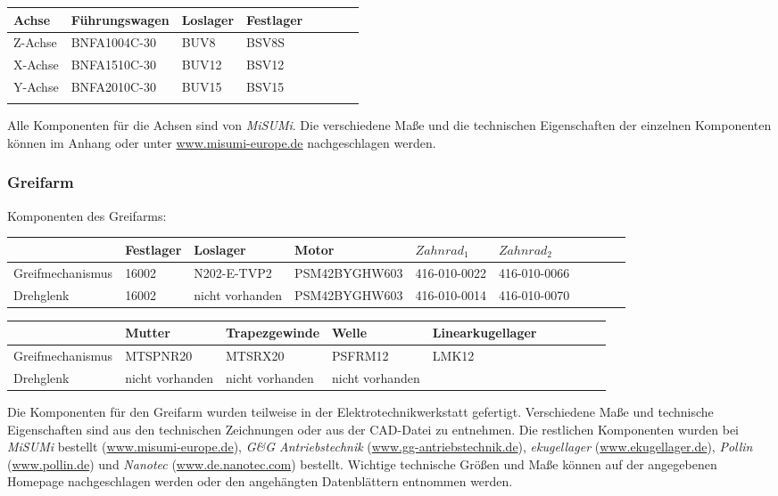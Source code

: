 \begin{tabular}{l l l l l l l l}
\rowcolor{hellgrün}
Achse&Führungswagen&Loslager&Festlager\\
\hline
Z-Achse&BNFA1004C-30&BUV8&BSV8S\\
\hline
X-Achse&BNFA1510C-30&BUV12&BSV12\\
\hline
Y-Achse&BNFA2010C-30&BUV15&BSV15\\
\newline
\newline
\end{tabular}

Alle Komponenten für die Achsen sind von \textsl{MiSUMi}. Die verschiedene Maße und die technischen Eigenschaften der einzelnen Komponenten  können im Anhang oder unter \url{www.misumi-europe.de} nachgeschlagen werden.
 


\subsubsection{Greifarm}




Komponenten des Greifarms:\\
\newline
\begin{tabular}{l| l l l l l l l l l}
\rowcolor{hellgrün}
 &Festlager&Loslager&Motor&$Zahnrad_1$&$Zahnrad_2$\\	%
\hline
Greifmechanismus&16002&N202-E-TVP2&PSM42BYGHW603&416-010-0022&416-010-0066\\
\hline
Drehglenk&16002&nicht vorhanden&PSM42BYGHW603&416-010-0014&416-010-0070\\
\end{tabular}
\newline
\newline

\begin{tabular}{l| l l l l l l l l l}
\rowcolor{hellgrün}
 &Mutter&Trapezgewinde&Welle&Linearkugellager\\	%
\hline
Greifmechanismus&MTSPNR20&MTSRX20&PSFRM12&LMK12\\
\hline
Drehglenk&nicht vorhanden&nicht vorhanden&nicht vorhanden&\\
\end{tabular}
\newline
\newline
Die Komponenten für den Greifarm wurden teilweise in der Elektrotechnikwerkstatt gefertigt. Verschiedene Maße und
technische Eigenschaften sind aus den technischen Zeichnungen oder aus der CAD-Datei zu entnehmen. Die restlichen Komponenten wurden bei \textsl{MiSUMi} bestellt (\url{www.misumi-europe.de}), \textsl{G\&G Antriebstechnik} (\url{www.gg-antriebstechnik.de}), \textsl{ekugellager} (\url{www.ekugellager.de}), \textsl{Pollin} (\url{www.pollin.de}) und \textsl{Nanotec} (\url{www.de.nanotec.com}) bestellt. Wichtige technische Größen und Maße können auf der angegebenen Homepage nachgeschlagen werden oder den angehängten Datenblättern entnommen werden.
 



